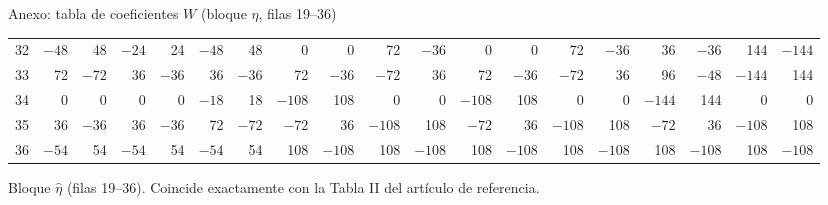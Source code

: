 \documentclass{beamer}
\begin{document}
\begin{frame}{Anexo: tabla de coeficientes $W$ (bloque $\hat\eta$, filas 19--36)}
\begin{center}
{\begin{tabular}{r|rrrrrrrrrrrrrrrrrr}
      \tiny 32 & $-48$ & 48 & $-24$ & 24 & $-48$ & 48 & 0 & 0 & 72 & $-36$ & 0 & 0 & 72 & $-36$ & 36 & $-36$ & 144 & $-144$\\
      \tiny 33 & 72 & $-72$ & 36 & $-36$ & 36 & $-36$ & 72 & $-36$ & $-72$ & 36 & 72 & $-36$ & $-72$ & 36 & 96 & $-48$ & $-144$ & 144\\
      \tiny 34 & 0 & 0 & 0 & 0 & $-18$ & 18 & $-108$ & 108 & 0 & 0 & $-108$ & 108 & 0 & 0 & $-144$ & 144 & 0 & 0\\
      \tiny 35 & 36 & $-36$ & 36 & $-36$ & 72 & $-72$ & $-72$ & 36 & $-108$ & 108 & $-72$ & 36 & $-108$ & 108 & $-72$ & 36 & $-108$ & 108\\
      \tiny 36 & $-54$ & 54 & $-54$ & 54 & $-54$ & 54 & 108 & $-108$ & 108 & $-108$ & 108 & $-108$ & 108 & $-108$ & 108 & $-108$ & 108 & $-108$\\
    \end{tabular}}
  \end{center}
  \vspace{-0.1cm}
  {\scriptsize Bloque $\hat\eta$ (filas 19--36). Coincide exactamente con la
  Tabla II del artículo de referencia.}
\end{frame}
\end{document}
